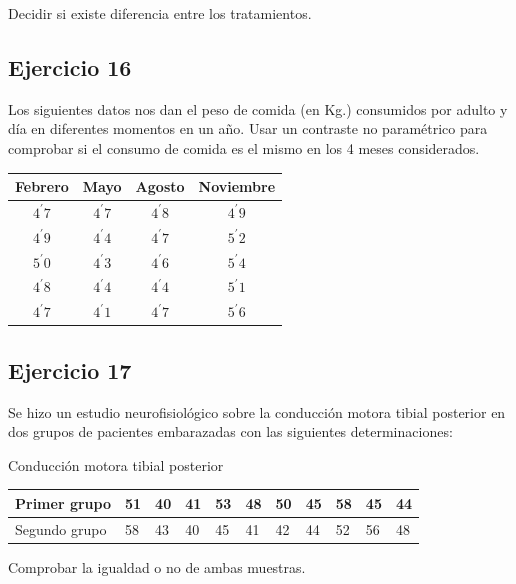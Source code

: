 \documentclass[
]{article}
\begin{document}
Decidir si existe diferencia entre los tratamientos.

\subsection{Ejercicio 16}\label{ejercicio-16}

Los siguientes datos nos dan el peso de comida (en Kg.) consumidos por adulto y día en diferentes momentos en un año. Usar un contraste no paramétrico para comprobar si el consumo de comida es el mismo en los 4 meses considerados.

\begin{longtable}[]{@{}cccc@{}}
\toprule\noalign{}
Febrero & Mayo & Agosto & Noviembre \\
\midrule\noalign{}
\endhead
\bottomrule\noalign{}
\endlastfoot
\(4^{\prime} 7\) & \(4^{\prime} 7\) & \(4^{\prime} 8\) & \(4^{\prime} 9\) \\
\(4^{\prime} 9\) & \(4^{\prime} 4\) & \(4^{\prime} 7\) & \(5^{\prime} 2\) \\
\(5^{\prime} 0\) & \(4^{\prime} 3\) & \(4^{\prime} 6\) & \(5^{\prime} 4\) \\
\(4^{\prime} 8\) & \(4^{\prime} 4\) & \(4^{\prime} 4\) & \(5^{\prime} 1\) \\
\(4^{\prime} 7\) & \(4^{\prime} 1\) & \(4^{\prime} 7\) & \(5^{\prime} 6\) \\
\end{longtable}

\subsection{Ejercicio 17}\label{ejercicio-17}

Se hizo un estudio neurofisiológico sobre la conducción motora tibial posterior en dos grupos de pacientes embarazadas con las siguientes determinaciones:

Conducción motora tibial posterior

\begin{longtable}[]{@{}lllllllllll@{}}
\toprule\noalign{}
Primer grupo & 51 & 40 & 41 & 53 & 48 & 50 & 45 & 58 & 45 & 44 \\
\midrule\noalign{}
\endhead
\bottomrule\noalign{}
\endlastfoot
Segundo grupo & 58 & 43 & 40 & 45 & 41 & 42 & 44 & 52 & 56 & 48 \\
\end{longtable}

Comprobar la igualdad o no de ambas muestras.
\end{document}
